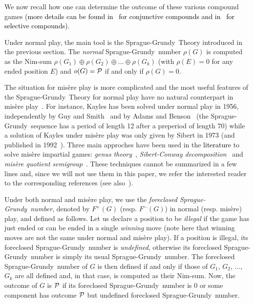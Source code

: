 \documentclass[11pt]{article}
\newcommand{\modif}[1]{\textcolor{black}{#1}}
\newcommand{\SP}{Sprague-Grundy}
\newcommand{\nimsum}{\oplus}
\newcommand{\PP}{{\cal P}}
\begin{document}
We now recall how one can determine the outcome of these various compound games
\modif{(more details can be found in~\cite[Chapter~9]{WW} for conjunctive compounds and
in~\cite[Chapter~10]{WW} for selective compounds)}.

\vskip 4mm

Under normal play, the main tool is the \SP\ Theory introduced in the previous section.
The {\em normal} \SP\ number $\rho(G)$ is computed as the Nim-sum
$\rho(G_1)\nimsum\rho(G_2)\nimsum\dots\nimsum\rho(G_k)$
(with $\rho(E)=0$ for any ended position $E$)
and $o(G)=\PP$ if and only if $\rho(G)=0$.

The situation for mis\`ere play is more complicated and the most useful
features of the \SP\ Theory for normal play have no natural
counterpart in mis\`ere play~\cite[Chapter 13]{WW}.
For instance, Kayles has been solved under normal play
in 1956, independently by Guy and Smith~\cite{GUY-SMITH-56}
and by Adams and Benson~\cite{ADAMS-BENSON-56} (the
\SP\ sequence has a period of length 12 after a preperiod
of length 70) while a solution of Kayles under mis\`ere play
was only given by Sibert in 1973 (and published in
1992~\cite{SIBERT-CONWAY-92}).
Three main approches have been used in the \modif{literature} to solve
mis\`ere impartial games:
{\em genus theory}~\cite{ALLEMANG-01,WW},
{\em Sibert-Conway decomposition}~\cite{SIBERT-CONWAY-92}
and {\em mis\`ere quotient semigroup}~\cite{PLAMBECK-05}.
These techniques cannot be summarized in a few lines and,
since we will not use them in this paper, we refer the
interested reader to the corresponding references
(see also~\cite{WEB-PLAMBECK}).

\vskip 4mm

Under both normal and mis\`ere play, we use the {\em foreclosed \SP\ number},
denoted by $F^+(G)$ (resp. $F^-(G)$) in normal (resp. mis\`ere) play, and
defined as follows.
Let us declare a position to be {\em illegal} if the game has just ended
or can be ended in a single {\em winning} move (note here that winning moves are
not the same under normal and mis\`ere play). 
If a position is illegal, its foreclosed \SP\ number
is {\em undefined}, otherwise its foreclosed \SP\ number
is simply its usual \SP\ number.
The foreclosed \SP\ number
of $G$ is then defined if and only if those of 
$G_1$, $G_2$, $\dots$, $G_k$ are all defined and, in that case, is computed
as their Nim-sum.
Now, the outcome of $G$ is $\PP$ if its foreclosed \SP\ number is 0
or some component has outcome $\PP$ but undefined foreclosed \SP\ number.
\end{document}
